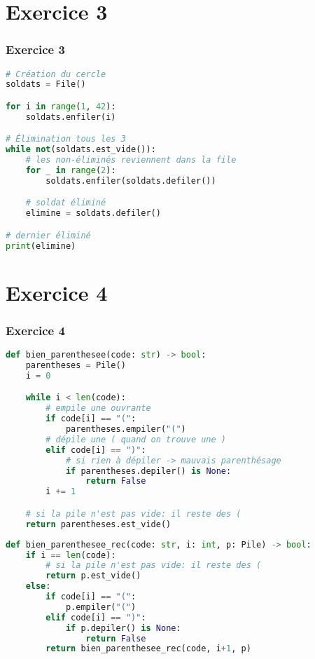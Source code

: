 \documentclass[svgnames,11pt]{beamer}
\begin{document}
\section{Exercice 3}
\begin{frame}[fragile]
    \frametitle{Exercice 3}

\begin{lstlisting}[language=Python , basicstyle=\ttfamily\small, xleftmargin=2em, xrightmargin=2em]
# Création du cercle
soldats = File()

for i in range(1, 42):
    soldats.enfiler(i)

# Élimination tous les 3
while not(soldats.est_vide()):
    # les non-éliminés reviennent dans la file
    for _ in range(2):
        soldats.enfiler(soldats.defiler())

    # soldat éliminé
    elimine = soldats.defiler()

# dernier éliminé
print(elimine)
\end{lstlisting}

\end{frame}
\section{Exercice 4}
\begin{frame}[fragile]
    \frametitle{Exercice 4}

\begin{lstlisting}[language=Python , basicstyle=\ttfamily\small, xleftmargin=1em, xrightmargin=0em]
def bien_parenthesee(code: str) -> bool:
    parentheses = Pile()
    i = 0

    while i < len(code):
        # empile une ouvrante
        if code[i] == "(":
            parentheses.empiler("(")
        # dépile une ( quand on trouve une )
        elif code[i] == ")":
            # si rien à dépiler -> mauvais parenthésage
            if parentheses.depiler() is None:
                return False
        i += 1

    # si la pile n'est pas vide: il reste des (
    return parentheses.est_vide()
\end{lstlisting}

\end{frame}
\begin{frame}[fragile]

\begin{lstlisting}[language=Python , basicstyle=\ttfamily\small, xleftmargin=0em, xrightmargin=0em]
def bien_parenthesee_rec(code: str, i: int, p: Pile) -> bool:
    if i == len(code):
        # si la pile n'est pas vide: il reste des (
        return p.est_vide()
    else:
        if code[i] == "(":
            p.empiler("(")
        elif code[i] == ")":
            if p.depiler() is None:
                return False
        return bien_parenthesee_rec(code, i+1, p)
\end{lstlisting}

\end{frame}
\end{document}
